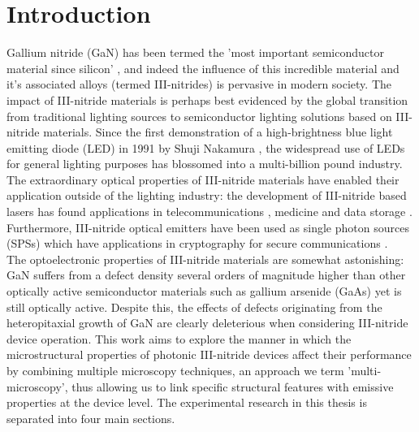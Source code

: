 
\chapter{Introduction}  %

\ifpdf
    \graphicspath{{Chapter1/Figs/Raster/}{Chapter1/Figs/PDF/}{Chapter1/Figs/}}
\else
    \graphicspath{{Chapter1/Figs/Vector/}{Chapter1/Figs/}}
\fi

Gallium nitride  (GaN) has been termed the 'most important semiconductor material since silicon' \cite{Humphreys2008}, and indeed the influence of this incredible material and it's associated alloys (termed III-nitrides) is pervasive in modern society. The impact of III-nitride materials is perhaps best evidenced by the global transition from traditional lighting sources to semiconductor lighting solutions based on III-nitride materials. Since the first demonstration of a high-brightness blue light emitting diode  (LED) in 1991 by Shuji Nakamura \cite{Nakamura1991}, the widespread use of LEDs for general lighting purposes has blossomed into a multi-billion pound industry. The extraordinary optical properties of III-nitride materials have enabled their application outside of the lighting industry: the development of III-nitride based lasers has found applications in telecommunications \cite{Najda2015}, medicine \cite{BerlienBreuerMuellerEtAl2012} and data storage . Furthermore, III-nitride optical emitters have been used as single photon sources  (SPSs) which have applications in cryptography for secure communications \cite{Kako2006}.
\\The optoelectronic properties of III-nitride materials are somewhat astonishing: GaN suffers from a defect density several orders of magnitude higher than other optically active semiconductor materials such as gallium arsenide  (GaAs) \cite{Bennett2010b} yet is still optically active. Despite this, the effects of defects originating from the heteropitaxial growth of GaN are clearly deleterious when considering III-nitride device operation. 
This work aims to explore the manner in which the microstructural properties of photonic III-nitride devices affect their performance by combining multiple microscopy techniques, an approach we term 'multi-microscopy', thus allowing us to link specific structural features with emissive properties at the device level. The experimental research in this thesis is separated into four main sections. 
